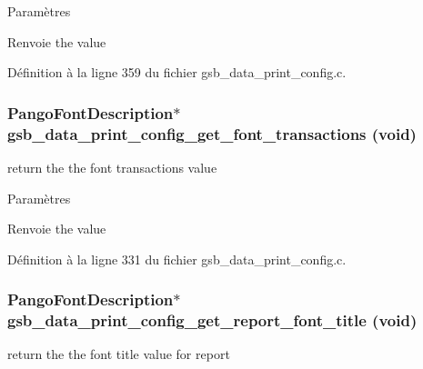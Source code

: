 \begin{DoxyParams}{Paramètres}
\item[{\em }]\end{DoxyParams}
\begin{DoxyReturn}{Renvoie}
the value 
\end{DoxyReturn}


Définition à la ligne 359 du fichier gsb\_\-data\_\-print\_\-config.c.

\subsubsection[{gsb\_\-data\_\-print\_\-config\_\-get\_\-font\_\-transactions}]{\setlength{\rightskip}{0pt plus 5cm}PangoFontDescription$\ast$ gsb\_\-data\_\-print\_\-config\_\-get\_\-font\_\-transactions (void)}\label{gsb__data__print__config_8h_af32e6fae377170c98443900214ddd009}
return the the font transactions value


\begin{DoxyParams}{Paramètres}
\item[{\em }]\end{DoxyParams}
\begin{DoxyReturn}{Renvoie}
the value 
\end{DoxyReturn}


Définition à la ligne 331 du fichier gsb\_\-data\_\-print\_\-config.c.

\subsubsection[{gsb\_\-data\_\-print\_\-config\_\-get\_\-report\_\-font\_\-title}]{\setlength{\rightskip}{0pt plus 5cm}PangoFontDescription$\ast$ gsb\_\-data\_\-print\_\-config\_\-get\_\-report\_\-font\_\-title (void)}\label{gsb__data__print__config_8h_a42842df1055227a0faa8c7a17c2b2f46}
return the the font title value for report


